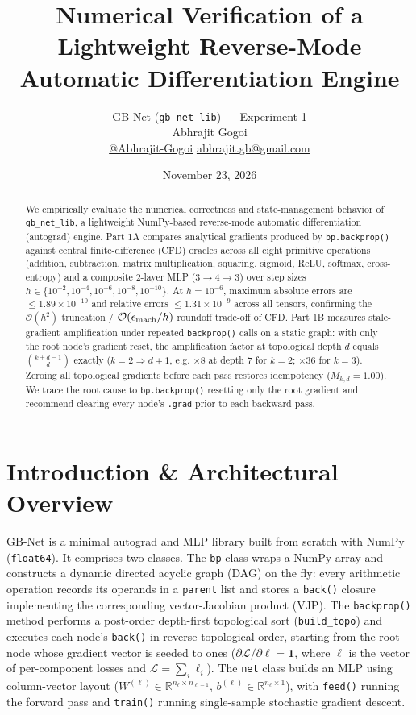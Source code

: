 \documentclass[11pt,a4paper]{article}
\title{\textbf{Numerical Verification of a Lightweight Reverse-Mode Automatic Differentiation Engine}}
\author{GB-Net (\texttt{gb\_net\_lib}) --- Experiment 1\\[0.5em]
\normalsize Abhrajit Gogoi\\[0.25em]
\normalsize \href{https://github.com/Abhrajit-Gogoi}{@Abhrajit-Gogoi} \quad \href{mailto:abhrajit.gb@gmail.com}{abhrajit.gb@gmail.com}}
\date{November 23, 2026}
\begin{document}
\maketitle

\begin{abstract}
\noindent We empirically evaluate the numerical correctness and state-management behavior of \texttt{gb\_net\_lib}, a lightweight NumPy-based reverse-mode automatic differentiation (autograd) engine. Part 1A compares analytical gradients produced by \texttt{bp.backprop()} against central finite-difference (CFD) oracles across all eight primitive operations (addition, subtraction, matrix multiplication, squaring, sigmoid, ReLU, softmax, cross-entropy) and a composite 2-layer MLP ($3 \to 4 \to 3$) over step sizes $h \in \{10^{-2}, 10^{-4}, 10^{-6}, 10^{-8}, 10^{-10}\}$. At $h = 10^{-6}$, maximum absolute errors are $\le 1.89 \times 10^{-10}$ and relative errors $\le 1.31 \times 10^{-9}$ across all tensors, confirming the $\mathcal{O}(h^2)$ truncation / $\mathcal{O}(\epsilon_{\rm mach}/h)$ roundoff trade-off of CFD. Part 1B measures stale-gradient amplification under repeated \texttt{backprop()} calls on a static graph: with only the root node's gradient reset, the amplification factor at topological depth $d$ equals $\binom{k+d-1}{d}$ exactly ($k=2 \Rightarrow d+1$, e.g. $\times 8$ at depth 7 for $k=2$; $\times 36$ for $k=3$). Zeroing all topological gradients before each pass restores idempotency ($M_{k,d} = 1.00$). We trace the root cause to \texttt{bp.backprop()} resetting only the root gradient and recommend clearing every node's \texttt{.grad} prior to each backward pass.
\end{abstract}

\section{Introduction \& Architectural Overview}

GB-Net is a minimal autograd and MLP library built from scratch with NumPy (\texttt{float64}). It comprises two classes. The \texttt{bp} class wraps a NumPy array and constructs a dynamic directed acyclic graph (DAG) on the fly: every arithmetic operation records its operands in a \texttt{parent} list and stores a \texttt{back()} closure implementing the corresponding vector-Jacobian product (VJP). The \texttt{backprop()} method performs a post-order depth-first topological sort (\texttt{build\_topo}) and executes each node's \texttt{back()} in reverse topological order, starting from the root node whose gradient vector is seeded to ones ($\partial\mathcal{L}/\partial\boldsymbol{\ell} = \mathbf{1}$, where $\boldsymbol{\ell}$ is the vector of per-component losses and $\mathcal{L}=\sum_i \ell_i$). The \texttt{net} class builds an MLP using column-vector layout ($W^{(\ell)} \in \mathbb{R}^{n_\ell \times n_{\ell-1}}$, $b^{(\ell)} \in \mathbb{R}^{n_\ell \times 1}$), with \texttt{feed()} running the forward pass and \texttt{train()} running single-sample stochastic gradient descent.
\end{document}
